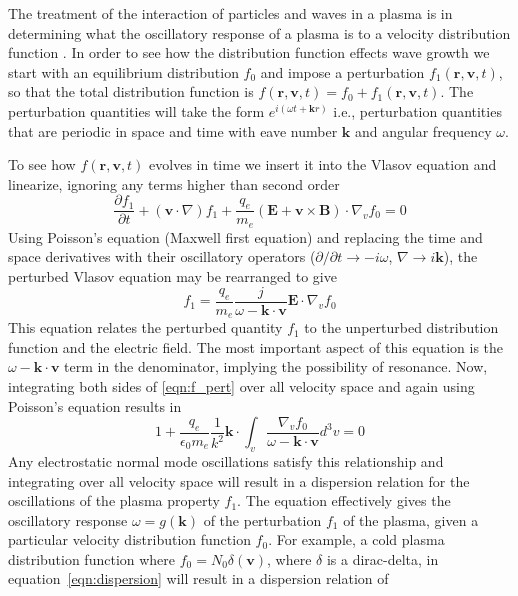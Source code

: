 The treatment of the interaction of particles and waves in a plasma is in determining what the oscillatory response of a plasma is to a velocity distribution function \citep{inan2011}. In order to see how the distribution function effects wave growth we start with an equilibrium distribution $f_0$ and impose a perturbation $f_1(\mathbf{r}, \mathbf{v}, t)$, so that the total distribution function is $f(\mathbf{r}, \mathbf{v}, t) = f_0 +f_1(\mathbf{r}, \mathbf{v}, t)$.  The perturbation quantities will take the form $e^{i(\omega t + \mathbf{k}r)}$ i.e., perturbation quantities that are periodic in space and time with eave number $\mathbf{k}$ and angular frequency $\omega$.

To see how $f(\mathbf{r}, \mathbf{v}, t)$ evolves in time we insert it into the Vlasov equation and linearize, ignoring any terms higher than second order
\begin{equation}
\frac{\partial f_1}{\partial t} + (\mathbf{v}\cdot \nabla)f_1 +\frac{q_e}{m_e}(\mathbf{E} + \mathbf{v}\times \mathbf{B})\cdot\nabla_vf_0=0
\end{equation}
Using Poisson's equation (Maxwell first equation) and replacing the time and space derivatives with their oscillatory operators ($\partial/\partial t \rightarrow -i\omega$, $\nabla \rightarrow i\mathbf{k}$), the perturbed Vlasov equation may be rearranged to give
\begin{equation}
f_1=\frac{q_e}{m_e}\frac{j}{\omega-\mathbf{k\cdot v}}\mathbf{E}\cdot\nabla_vf_0
\label{eqn:f_pert}
\end{equation}
This equation relates the perturbed quantity $f_1$ to the unperturbed distribution function and the electric field. The most important aspect of this equation is the $\omega-\mathbf{k\cdot v}$ term in the denominator, implying the possibility of resonance. Now, integrating both sides of \ref{eqn:f_pert} over all velocity space and again using Poisson's equation results in
\begin{equation}
1+\frac{q_e}{\epsilon_0m_e}\frac{1}{k^2}\mathbf{k}\cdot\int_v\frac{\nabla_v f_0}{\omega-\mathbf{k\cdot v}}d^3v=0
\label{eqn:dispersion}
\end{equation}
Any electrostatic normal mode oscillations satisfy this relationship and integrating over all velocity space will result in a dispersion relation for the oscillations of the plasma property $f_1$. The equation effectively gives the oscillatory response $\omega = g(\mathbf{k})$ of the perturbation $f_1$ of the plasma, given a particular velocity distribution function $f_0$. For example, a cold plasma distribution function where $f_0 = N_0\delta(\mathbf{v})$, where $\delta$ is a dirac-delta, in equation~\ref{eqn:dispersion} will result in a dispersion relation of
